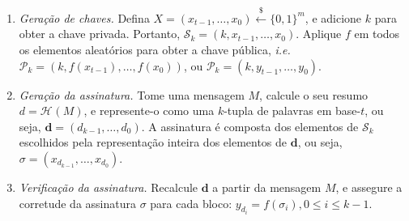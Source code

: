 \documentclass[12pt,notitlepage]{report}
\newcommand{\pk}{\mathcal{P}_k}
\newcommand{\sk}{\mathcal{S}_k}
\newcommand{\hash}[2][]{\mathcal{H}^{#1}(#2)}
\newcommand{\binwds}[1]{\{0, 1\}^{#1}}
\begin{document}
\begin{enumerate}

  \item[] \emph{Geração de chaves.} Defina $X = (x_{t - 1}, \dots, x_0)
      \stackrel{\$}{\longleftarrow} \binwds{m}$, e adicione $k$ para
      obter a chave privada. Portanto, $\sk{} = (k, x_{t - 1}, \dots, x_0)$.
      Aplique $f$ em todos os elementos aleatórios para obter a chave pública, \emph{i.e.}
      $\pk{} = (k, f(x_{t - 1}), \dots, f(x_0))$, ou $\pk{} = (k, y_{t - 1}, \dots, y_0)$.

  \item[] \emph{Geração da assinatura.} Tome uma mensagem $M$, calcule o seu
    resumo $d = \hash{M}$, e represente-o como uma $k$-tupla de palavras em base-$t$,
    ou seja, $\mathbf{d} = (d_{k - 1}, \dots, d_0)$. A assinatura é composta dos elementos
    de $\sk{}$ escolhidos pela representação inteira dos elementos de $\mathbf{d}$,
    ou seja, $\sigma = (x_{d_{k - 1}}, \dots, x_{d_{0}})$.

  \item[] \emph{Verificação da assinatura.} Recalcule $\mathbf{d}$ a partir da mensagem $M$,
    e assegure a corretude da assinatura $\sigma$ para cada bloco: $y_{d_{i}} = f(\sigma_{i}), 0 \leq i \leq k - 1$.

\end{enumerate}
\end{document}
